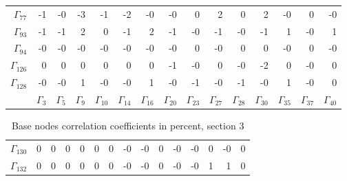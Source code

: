 {\begin{table}
\begin{center}
\begin{minipage}{\linewidth}
\begin{center}
\begin{envsmall}
\begin{center}
\begin{tabular}{rrrrrrrrrrrrrrr}
\( \Gamma_{77} \) &   -1 &   -0 &   -3 &   -1 &   -2 &   -0 &   -0 &    0 &    2 &    0 &    2 &   -0 &    0 &   -0 \\
\( \Gamma_{93} \) &   -1 &   -1 &    2 &    0 &   -1 &    2 &   -1 &   -0 &   -1 &   -0 &   -1 &    1 &   -0 &    1 \\
\( \Gamma_{94} \) &   -0 &   -0 &   -0 &   -0 &   -0 &   -0 &   -0 &    0 &   -0 &    0 &    0 &   -0 &    0 &   -0 \\
\( \Gamma_{126} \) &    0 &    0 &    0 &    0 &    0 &    0 &   -1 &   -0 &    0 &   -0 &   -2 &    0 &   -0 &    0 \\
\( \Gamma_{128} \) &   -0 &   -0 &    1 &   -0 &   -0 &    1 &   -0 &   -1 &   -0 &   -1 &   -0 &    1 &   -0 &    0 \\
 & \( \Gamma_{3} \) & \( \Gamma_{5} \) & \( \Gamma_{9} \) & \( \Gamma_{10} \) & \( \Gamma_{14} \) & \( \Gamma_{16} \) & \( \Gamma_{20} \) & \( \Gamma_{23} \) & \( \Gamma_{27} \) & \( \Gamma_{28} \) & \( \Gamma_{30} \) & \( \Gamma_{35} \) & \( \Gamma_{37} \) & \( \Gamma_{40} \)
\\\hline
\end{tabular}
\end{center}
\end{envsmall}
\ifhevea\else
\end{center}
\end{minipage}
\fi
\end{center}
\ifhevea\end{table}\fi
\ifhevea\begin{table}\fi%
\begin{center}
\ifhevea
\caption{Base nodes correlation coefficients in percent, section 3\label{tab:br-fit-corr3}}%
\else
\begin{minipage}{\linewidth}
\begin{center}
\label{tab:br-fit-corr3}%
\fi
\begin{envsmall}
\begin{center}
\renewcommand*{\arraystretch}{1.1}%
\begin{tabular}{rrrrrrrrrrrrrrr}
\hline
\( \Gamma_{130} \) &    0 &    0 &    0 &    0 &    0 &    0 &   -0 &   -0 &    0 &   -0 &   -0 &    0 &   -0 &    0 \\
\( \Gamma_{132} \) &    0 &    0 &    0 &    0 &    0 &    0 &   -0 &   -0 &    0 &   -0 &   -0 &    1 &    1 &    0 \\

\end{tabular}
\end{center}
\end{envsmall}
\end{center}
\end{minipage}
\end{center}
\end{table}}
